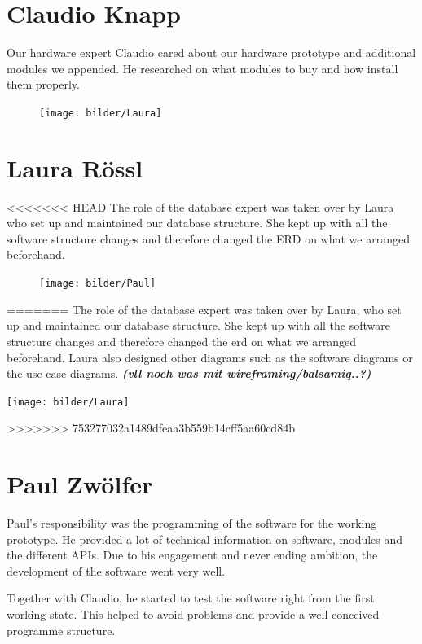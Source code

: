 \section*{Claudio Knapp}
Our hardware expert Claudio cared about our hardware prototype and additional modules we appended. He researched on what modules to buy and how install them properly. 
\newpage
\begin{figure}
    \texttt{[image: bilder/Laura]}
\end{figure}
\section*{Laura Rössl}
<<<<<<< HEAD
The role of the database expert was taken over by Laura who set up and maintained our database structure. She kept up with all the software structure changes and therefore changed the ERD on what we arranged beforehand. 

\begin{figure}
    \texttt{[image: bilder/Paul]}
\end{figure}
=======
The role of the database expert was taken over by Laura, who set up and maintained our database structure. She kept up with all the software structure changes and therefore changed the \gls{erd} on what we arranged beforehand. Laura also designed other diagrams such as the software diagrams or the use case diagrams. \textit{\textbf{(vll noch was mit wireframing/balsamiq..?)}}
\begin{center}
\texttt{[image: bilder/Laura]}
\end{center}
>>>>>>> 753277032a1489dfeaa3b559b14cff5aa60cd84b
\section*{Paul Zwölfer}
Paul's responsibility was the programming of the software for the working prototype. He provided a lot of technical information on software, modules and the different APIs. Due to his engagement and never ending ambition, the development of the software went very well.

Together with Claudio, he started to test the software right from the first working state. This helped to avoid problems and provide a well conceived programme structure.
